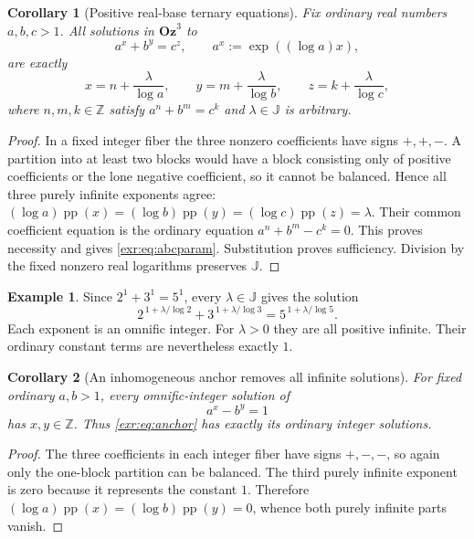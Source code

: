 \documentclass[11pt,letterpaper]{article}
\numberwithin{equation}{section}
\newtheorem{corollary}[corollary]{Corollary}
\theoremstyle{definition}
\newtheorem{example}[example]{Example}
\theoremstyle{remark}
\newcommand{\Oz}{\mathbf{Oz}}
\newcommand{\Z}{\mathbb Z}
\newcommand{\J}{\mathbb J}
\newcommand{\pp}{\operatorname{pp}}
\begin{document}
\begin{corollary}[Positive real-base ternary equations]\label{exr:cor:ternary}
Fix ordinary real numbers $a,b,c>1$. All solutions in $\Oz^3$ to
\begin{equation}\label{exr:eq:abc}
 a^x+b^y=c^z,\qquad a^x:=\exp((\log a)x),
\end{equation}
are exactly
\begin{equation}\label{exr:eq:abcparam}
 x=n+\frac{\lambda}{\log a},\qquad
 y=m+\frac{\lambda}{\log b},\qquad
 z=k+\frac{\lambda}{\log c},
\end{equation}
where $n,m,k\in\Z$ satisfy $a^n+b^m=c^k$ and $\lambda\in\J$ is arbitrary.
\end{corollary}
\begin{proof}
In a fixed integer fiber the three nonzero coefficients have signs $+,+,-$.
A partition into at least two blocks would have a block consisting only of positive
coefficients or the lone negative coefficient, so it cannot be balanced. Hence all
three purely infinite exponents agree:
$(\log a)\pp(x)=(\log b)\pp(y)=(\log c)\pp(z)=\lambda$.
Their common coefficient equation is the ordinary equation
$a^n+b^m-c^k=0$. This proves necessity and gives \eqref{exr:eq:abcparam}. Substitution
proves sufficiency. Division by the fixed nonzero real logarithms preserves $\J$.
\end{proof}

\begin{example}
Since $2^1+3^1=5^1$, every $\lambda\in\J$ gives the solution
\begin{equation}
 2^{\,1+\lambda/\log2}+3^{\,1+\lambda/\log3}
 =5^{\,1+\lambda/\log5}.
\end{equation}
Each exponent is an omnific integer. For $\lambda>0$ they are all positive
infinite. Their ordinary constant terms are nevertheless exactly $1$.
\end{example}

\begin{corollary}[An inhomogeneous anchor removes all infinite solutions]
For fixed ordinary $a,b>1$, every omnific-integer solution of
\begin{equation}\label{exr:eq:anchor} a^x-b^y=1 \end{equation}
has $x,y\in\Z$. Thus \eqref{exr:eq:anchor} has exactly its ordinary integer solutions.
\end{corollary}
\begin{proof}
The three coefficients in each integer fiber have signs $+,-,-$, so again only
the one-block partition can be balanced. The third purely infinite exponent is
zero because it represents the constant $1$. Therefore
$(\log a)\pp(x)=(\log b)\pp(y)=0$, whence both purely infinite parts vanish.
\end{proof}
\end{document}

